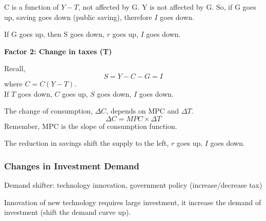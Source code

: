 \documentclass[12pt]{article}
\begin{document}
C is a function of $ Y - T $, not affected by G. Y is not affected by G. So, if G 
goes up, saving goes down (public saving), therefore $ I $ goes down.

If G goes up, then S goes down, $ r $ goes up, $ I $ goes down.
\begin{figure}[H]
\end{figure}




{\textbf {Factor 2: Change in taxes (T)}}

Recall,
\begin{equation*}
S = Y - C - G = I
\end{equation*}
where $ C = C(Y - T) $.\\
If $ T $ goes down, $ C $ goes up, $ S $ goes down, $ I $ goes down.

The change of consumption, $ \Delta C $, depends on MPC and $ \Delta T $.
\begin{equation*}
\Delta C = MPC  \times \Delta T
\end{equation*}
Remember, MPC is the slope of consumption function.

The reduction in savings shift the supply to the left, $ r $ goes up, $ I $ goes down.



\subsubsection{Changes in Investment Demand}


Demand shifter: technology innovation, government policy (increase/decrease tax)

Innovation of new technology requires large investment, it increase the demand of 
investment (shift the demand curve up).
\end{document}
